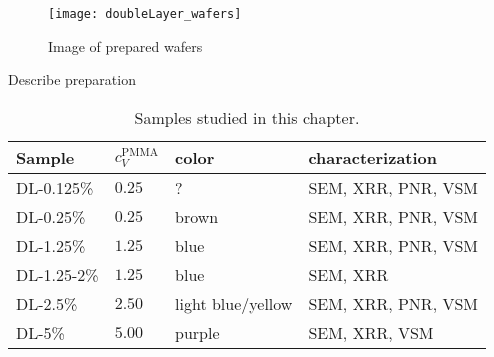\documentclass[\main/dresen_thesis.tex]{subfiles}
\begin{document}
  \begin{figure}[tb]
    \centering
    \texttt{[image: doubleLayer\_wafers]}
    \caption{\label{fig:doubleLayers:preparation:waferImage}Image of prepared wafers}
  \end{figure}

  Describe preparation

  \begin{table}[!htbp]
    \centering
    \caption{\label{tab:doubleLayers:preparation:samples}Samples studied in this chapter.}
    \begin{tabular}{ l | l | l | l}
      \textbf{Sample}  & $c_V^\mathrm{PMMA}$ & color & characterization\\
      \hline
      DL-0.125\%    & $0.25$ & ?                & SEM, XRR, PNR, VSM\\
      DL-0.25\%     & $0.25$ & brown            & SEM, XRR, PNR, VSM\\
      DL-1.25\%     & $1.25$ & blue             & SEM, XRR, PNR, VSM\\
      DL-1.25-2\%   & $1.25$ & blue             & SEM, XRR\\
      DL-2.5\%      & $2.50$ & light blue/yellow& SEM, XRR, PNR, VSM\\
      DL-5\%        & $5.00$ & purple           & SEM, XRR, VSM\\
      \hline
    \end{tabular}
  \end{table}

\end{document}
